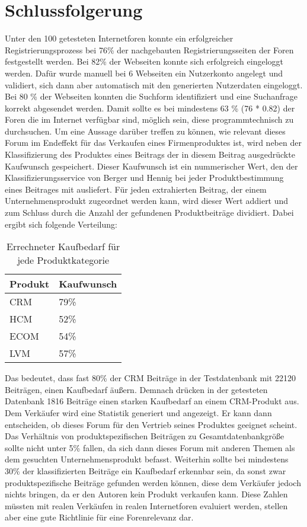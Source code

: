 \section{Schlussfolgerung}
Unter den 100 getesteten Internetforen konnte ein erfolgreicher Registrierungsprozess bei 76\% der nachgebauten Registrierungsseiten der Foren festgestellt werden. Bei 82\% der Webseiten konnte sich erfolgreich eingeloggt werden. Dafür wurde manuell bei 6 Webseiten ein Nutzerkonto angelegt und validiert, sich dann aber automatisch mit den generierten Nutzerdaten eingeloggt. Bei 80 \% der Webseiten konnten die Suchform identifiziert und eine Suchanfrage korrekt abgesendet werden. Damit sollte es bei mindestens 63 \% (76 * 0.82) der Foren die im Internet verfügbar sind, möglich sein, diese programmtechnisch zu durchsuchen.
Um eine Aussage darüber treffen zu können, wie relevant dieses Forum im Endeffekt für das Verkaufen eines Firmenproduktes ist, wird neben der Klassifizierung des Produktes eines Beitrags der in diesem Beitrag ausgedrückte Kaufwunsch gespeichert. Dieser Kaufwunsch ist ein nummerischer Wert, den der Klassifizierungsservice von Berger und Hennig\cite{n2o} bei jeder Produktbestimmung eines Beitrages mit ausliefert. Für jeden extrahierten Beitrag, der einem Unternehmensprodukt zugeordnet werden kann, wird dieser Wert addiert und zum Schluss durch die Anzahl der gefundenen Produktbeiträge dividiert. Dabei ergibt sich folgende Verteilung: 

\begin{table}[h!]
\centering
\begin{tabular}{ | p{3cm} | l |}
\hline
\textbf{Produkt} & \textbf{Kaufwunsch}\\ \hline
CRM & 79\% \\ \hline
HCM & 52\% \\ \hline
ECOM & 54\% \\ \hline
LVM & 57\% \\ \hline
\end{tabular}
\caption{Errechneter Kaufbedarf für jede Produktkategorie}
\end{table}

Das bedeutet, dass fast 80\% der CRM Beiträge in der Testdatenbank mit 22120 Beiträgen, einen Kaufbedarf äußern. Demnach drücken in der getesteten Datenbank 1816 Beiträge einen starken Kaufbedarf an einem CRM-Produkt aus. Dem Verkäufer wird eine Statistik generiert und angezeigt. Er kann dann entscheiden, ob dieses Forum für den Vertrieb seines Produktes geeignet scheint. Das Verhältnis von produktspezifischen Beiträgen zu Gesamtdatenbankgröße sollte nicht unter 5\% fallen, da sich dann dieses Forum mit anderen Themen als dem gesuchten Unternehmensprodukt befasst. Weiterhin sollte bei mindestens 30\% der klassifizierten Beiträge ein Kaufbedarf erkennbar sein, da sonst zwar produktspezifische Beiträge gefunden werden können, diese dem Verkäufer jedoch nichts bringen, da er den Autoren kein Produkt verkaufen kann. Diese Zahlen müssten mit realen Verkäufen in realen Internetforen evaluiert werden, stellen aber eine gute Richtlinie für eine Forenrelevanz dar.


